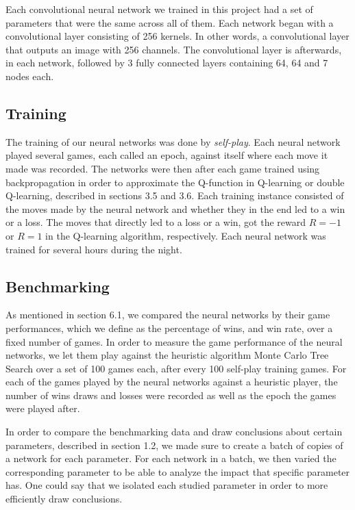 \documentclass[titlepage]{article}
\begin{document}
\vskip 0.2cm

\noindent
Each convolutional neural network we trained in this project had a set of parameters that were the same across all of them. Each network began with a convolutional layer consisting of 256 kernels. In other words, a convolutional layer that outputs an image with 256 channels. The convolutional layer is afterwards, in each network, followed by 3 fully connected layers containing 64, 64 and 7 nodes each.

\subsection{Training}

\vskip 0.2cm

The training of our neural networks was done by \emph{self-play}. Each neural network played several games, each called an epoch, against itself where each move it made was recorded. The networks were then after each game trained using backpropagation in order to approximate the Q-function in Q-learning or double Q-learning, described in sections 3.5 and 3.6. Each training instance consisted of the moves made by the neural network and whether they in the end led to a win or a loss. The moves that directly led to a loss or a win, got the reward $R = -1$ or $R = 1$ in the Q-learning algorithm, respectively. Each neural network was trained for several hours during the night.

\newpage

\subsection{Benchmarking}

\vskip 0.2cm

As mentioned in section 6.1, we compared the neural networks by their game performances, which we define as the percentage of wins, and win rate, over a fixed number of games. In order to measure the game performance of the neural networks, we let them play against the heuristic algorithm Monte Carlo Tree Search over a set of 100 games each, after every 100 self-play training games. For each of the games played by the neural networks against a heuristic player, the number of wins draws and losses were recorded as well as the epoch the games were played after.

\vskip 0.2cm

\noindent
In order to compare the benchmarking data and draw conclusions about certain parameters, described in section 1.2, we made sure to create a batch of copies of a network for each parameter. For each network in a batch, we then varied the corresponding parameter to be able to analyze the impact that specific parameter has. One could say that we isolated each studied parameter in order to more efficiently draw conclusions.
\end{document}
